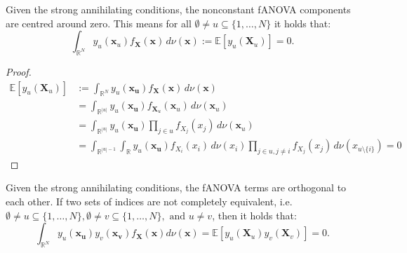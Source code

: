 \begin{proposition}
    Given the strong annihilating conditions, the nonconstant fANOVA components are centred around zero. This means for all $\emptyset \neq u \subseteq \{1, \dots, N\}$ it holds that:
\begin{equation}
    \int_{\mathbb{R}^N} y_u(\boldsymbol{x}_u) f_{\boldsymbol{X}}(\boldsymbol{x}) \, d\nu (\boldsymbol{x}) := \mathbb{E}[y_u(\boldsymbol{X}_u)] = 0.
    \label{eq:zero_mean_c}
\end{equation}
\end{proposition}
\begin{proof}
\begin{align*}
    \mathbb{E}[y_u(\boldsymbol{X}_u)] &:= \int_{\mathbb{R}^{N}} y_u(\boldsymbol{x_u}) f_{\boldsymbol{X}}(\boldsymbol{x}) \, d\nu (\boldsymbol{x}) \\
    &= \int_{\mathbb{R}^{|u|}} y_u(\boldsymbol{x_u}) f_{\boldsymbol{X}_u}(\boldsymbol{x}_u) \, d\nu (\boldsymbol{x}_u) \\
    &= \int_{\mathbb{R}^{|u|}} y_u(\boldsymbol{x_u}) \prod_{j \in u} f_{X_j}(x_j) \, d\nu (\boldsymbol{x}_u) \\
    &= \int_{\mathbb{R}^{|u|-1}} \int_{\mathbb{R}} y_u(\boldsymbol{x_u}) f_{X_i}(x_i) \, d\nu(x_i) \prod_{j \in u, j \neq i} f_{X_j}(x_j) \, d\nu (x_{u \setminus \{i\}}) = 0
\end{align*}
\end{proof}

\begin{proposition}
    Given the strong annihilating conditions, the fANOVA terms are orthogonal to each other. If two sets of indices are not completely equivalent, i.e.
    $\emptyset \neq u \subseteq \{1, \dots, N\}, \emptyset \neq v \subseteq \{1, \dots, N\}, \text{ and } u \neq v$, then it holds that:
\begin{equation}
    \int_{\mathbb{R}^N} y_u(\boldsymbol{x_u}) y_v(\boldsymbol{x_v}) f_{\boldsymbol{X}}(\boldsymbol{x}) d\nu (\boldsymbol{x}) = \mathbb{E}[y_u(\boldsymbol{X}_u) y_v(\boldsymbol{X}_v)] = 0.
    \label{eq:orthogonality_c}
\end{equation}
\end{proposition}

